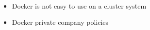 \begin{frame}

\begin{itemize}[<3>]
	\item Docker is not easy to use on a cluster system
	\item Docker private company policies
\end{itemize}
\end{frame}

